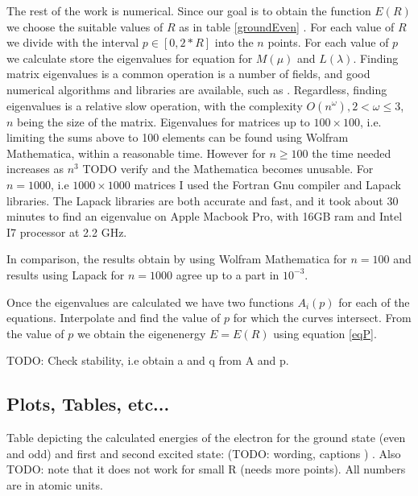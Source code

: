 The rest of the work is numerical. Since our goal is to obtain the function $ E(R) $ we choose the suitable values of $ R $ as in table \ref{groundEven} . For each value of $ R $ we divide with the interval $ p \in [0,2*R] $ into the $ n $ points. For each value of $ p $ we calculate store the eigenvalues for equation for $ M(\mu) $ and $ L(\lambda) $. Finding matrix eigenvalues is a common operation is a number of fields, and good numerical algorithms and libraries are available, such as \cite{Lapack1}.  Regardless, finding eigenvalues is a relative slow operation, with the complexity $ O(n^\omega), 2 < \omega \le 3 $, \cite{Lapack1} $ n $ being the size of the matrix.  Eigenvalues for matrices up to $ 100 \times 100 $, i.e. limiting the sums above to 100 elements can be found using Wolfram Mathematica, within a reasonable time. However for $ n \ge 100 $ the time needed increases as $ n^3 $ TODO verify and the Mathematica becomes unusable. For $  n = 1000 $, i.e $ 1000 \times 1000  $ matrices I used the Fortran Gnu compiler and Lapack \cite{Lapack1} libraries. The Lapack libraries are both accurate and fast, and it took about 30 minutes to find an eigenvalue on Apple Macbook Pro, with 16GB ram and Intel I7 processor at 2.2 GHz.

In comparison, the results obtain by using Wolfram Mathematica for $ n = 100 $ and results using Lapack for $ n = 1000 $  agree up to a part in $ 10^{-3} $.

Once the eigenvalues are calculated we have two functions $ A_i(p) $ for each of the equations. Interpolate and find the value of $ p $ for which the curves intersect. From the value of $ p $ we obtain the eigenenergy $ E = E(R) $ using equation \eqref{eqP}.

TODO: Check stability, i.e obtain a and q from A and p.

\subsection{Plots, Tables, etc... }

Table depicting the calculated energies of the electron for the ground state (even and odd) and first and second excited state: (TODO: wording, captions ) . Also TODO: note that it does not work for small R (needs more points). All numbers are in atomic units.

